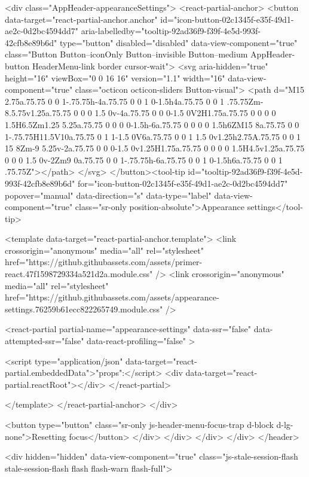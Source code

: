                 <div class="AppHeader-appearanceSettings">
    <react-partial-anchor>
      <button data-target="react-partial-anchor.anchor" id="icon-button-02c1345f-e35f-49d1-ae2c-0d2bc4594dd7" aria-labelledby="tooltip-92ad36f9-f39f-4e5d-993f-42cfb8e89b6d" type="button" disabled="disabled" data-view-component="true" class="Button Button--iconOnly Button--invisible Button--medium AppHeader-button HeaderMenu-link border cursor-wait">  <svg aria-hidden="true" height="16" viewBox="0 0 16 16" version="1.1" width="16" data-view-component="true" class="octicon octicon-sliders Button-visual">
    <path d="M15 2.75a.75.75 0 0 1-.75.75h-4a.75.75 0 0 1 0-1.5h4a.75.75 0 0 1 .75.75Zm-8.5.75v1.25a.75.75 0 0 0 1.5 0v-4a.75.75 0 0 0-1.5 0V2H1.75a.75.75 0 0 0 0 1.5H6.5Zm1.25 5.25a.75.75 0 0 0 0-1.5h-6a.75.75 0 0 0 0 1.5h6ZM15 8a.75.75 0 0 1-.75.75H11.5V10a.75.75 0 1 1-1.5 0V6a.75.75 0 0 1 1.5 0v1.25h2.75A.75.75 0 0 1 15 8Zm-9 5.25v-2a.75.75 0 0 0-1.5 0v1.25H1.75a.75.75 0 0 0 0 1.5H4.5v1.25a.75.75 0 0 0 1.5 0v-2Zm9 0a.75.75 0 0 1-.75.75h-6a.75.75 0 0 1 0-1.5h6a.75.75 0 0 1 .75.75Z"></path>
</svg>
</button><tool-tip id="tooltip-92ad36f9-f39f-4e5d-993f-42cfb8e89b6d" for="icon-button-02c1345f-e35f-49d1-ae2c-0d2bc4594dd7" popover="manual" data-direction="s" data-type="label" data-view-component="true" class="sr-only position-absolute">Appearance settings</tool-tip>

      <template data-target="react-partial-anchor.template">
        <link crossorigin="anonymous" media="all" rel="stylesheet" href="https://github.githubassets.com/assets/primer-react.47f1598729334a521d2a.module.css" />
<link crossorigin="anonymous" media="all" rel="stylesheet" href="https://github.githubassets.com/assets/appearance-settings.76259b61ecc822265749.module.css" />

<react-partial
  partial-name="appearance-settings"
  data-ssr="false"
  data-attempted-ssr="false"
  data-react-profiling="false"
>
  
  <script type="application/json" data-target="react-partial.embeddedData">{"props":{}}</script>
  <div data-target="react-partial.reactRoot"></div>
</react-partial>

      </template>
    </react-partial-anchor>
  </div>

          <button type="button" class="sr-only js-header-menu-focus-trap d-block d-lg-none">Resetting focus</button>
        </div>
      </div>
    </div>
  </div>
</header>

      <div hidden="hidden" data-view-component="true" class="js-stale-session-flash stale-session-flash flash flash-warn flash-full">
  
